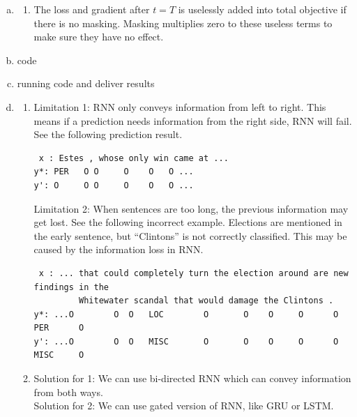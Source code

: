 \documentclass[11pt, oneside]{article}      %
\newcommand{\hasPageBreak}{\newpage}
\begin{document}
\begin{enumerate}   [(a)]
\hasPageBreak
\item 
\begin{enumerate}   [i]
\item The loss and gradient after $t=T$ is uselessly added into total objective if there is no masking. Masking multiplies zero to these useless terms to make sure they have no effect.
\end{enumerate}

\item code

\item running code and deliver results


\hasPageBreak
\item 
\begin{enumerate}   [i]
\item
 Limitation 1: RNN only conveys information from left to right. This means if a prediction needs information from the right side, RNN will fail. See the following prediction result.
\begin{verbatim}
 x : Estes , whose only win came at ...
y*: PER   O O     O    O   O ...
y': O     O O     O    O   O ...
\end{verbatim}
 Limitation 2: When sentences are too long, the previous information may get lost. See the following incorrect example. Elections are mentioned in the early sentence, but ``Clintons'' is not correctly classified. This may be caused by the information loss in RNN.
 \begin{verbatim}
 x : ... that could completely turn the election around are new findings in the 
         Whitewater scandal that would damage the Clintons . 
y*: ...O        O  O   LOC        O       O    O     O      O   PER      O 
y': ...O        O  O   MISC       O       O    O     O      O   MISC     O 	
 \end{verbatim}

 \item Solution for 1: We can use bi-directed RNN which can convey information from both ways. \\
Solution for 2: We can use gated version of RNN, like GRU or LSTM.
\end{enumerate}

\end{enumerate}




\hasPageBreak
\end{document}
